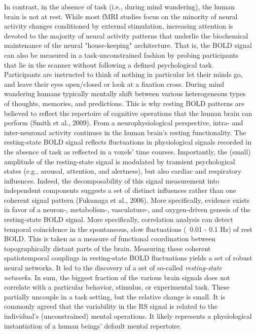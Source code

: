 \documentclass[authoryear,review,3p]{elsarticle}
\begin{document}
In contrast,
in the absence of task (i.e., during mind wandering),
the human brain is not at rest.
While most fMRI studies focus on the minority of neural activity changes
conditioned by external stimulation,
increasing attention is devoted to
the majority of neural activity patterns
that underlie the biochemical maintenance of
the neural "house-keeping" architecture.
That is,
the BOLD signal can also be measured in a task-unconstrained fashion
by probing participants that lie in the scanner without following
a defined psychological task.
Participants are instructed to think of nothing in particular
let their minds go, and leave their eyes open/closed or
look at a fixation cross. During mind wandering humans typically mentally shift
between various heterogeneous types of thoughts, memories, and predictions.
This is why resting BOLD patterns are believed to reflect the repertoire of
cognitive operations that the human brain can perform (Smith et al., 2009).
%
From a neurophysiological perspective,
intra- and inter-neuronal activity continues
in the human brain's resting functionality.
The resting-state BOLD signal reflects fluctuations in
physiological signals recorded in the absence of task
as reflected in a voxels' time courses.
Importantly, the (small) amplitude of the resting-state signal is modulated by
transient psychological states (e.g., arousal, attention, and alertness),
but also cardiac and respiratory influences.
Indeed, the decomposability of this signal measurement into independent
components suggests a set of distinct influences rather
than one coherent signal pattern (Fukunaga et al., 2006).
More specifically, evidence exists in favor of a neuron-, metabolism-,
vasculature-, and oxygen-driven genesis of the resting-state BOLD signal. 
%
More specifically,
correlation analysis can detect temporal coincidence in
the spontaneous, slow fluctuations (~0.01 - 0.1 Hz) of rest BOLD.
This is taken as a measure of functional coordination between
topographically distant parts of the brain.
Measuring these coherent spatiotemporal couplings in resting-state BOLD
fluctuations yields a set of robust neural networks.
It led to the discovery of a set of so-called
\textit{resting-state networks}.
%
In sum, the biggest fraction of the various brain
signals does not correlate with a particular
behavior, stimulus, or experimental task.
These partially uncouple in a task setting,
but the relative change is small.
It is commonly agreed that the variability in the RS signal is
related to the individual's (unconstrained) mental operations.
It likely represents a physiological
instantiation of a human beings' default mental repertoire.
\end{document}
